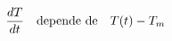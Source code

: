 \documentclass[preview]{standalone}
\begin{document}
\begin{align*}
\special{dvisvgm:raw <g id='unique000'>}\frac{dT}{dt} \quad \text{depende de} \quad T(t) - T_m\special{dvisvgm:raw </g>}
\end{align*}
\end{document}
